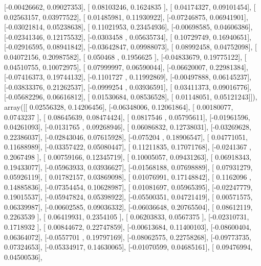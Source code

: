 \documentclass{article}
\begin{document}
       [-0.00426662,  0.09027353],
       [ 0.08103246,  0.1624835 ],
       [ 0.04174327,  0.09101454],
       [ 0.02563157,  0.03977522],
       [ 0.01485981,  0.11930922],
       [-0.07246875,  0.06941901],
       [-0.03021814,  0.05238638],
       [ 0.11021953,  0.23454936],
       [-0.00698585,  0.04606386],
       [-0.02341346,  0.12175532],
       [-0.0303458 ,  0.05635734],
       [ 0.10729749,  0.16940651],
       [-0.02916595,  0.08941842],
       [-0.03642847,  0.09988073],
       [ 0.08992458,  0.04752098],
       [ 0.04072156,  0.20987582],
       [ 0.050468  ,  0.1956625 ],
       [-0.04833679,  0.19775122],
       [ 0.04510755,  0.10072975],
       [ 0.07999997,  0.06590044],
       [-0.06620007,  0.22981384],
       [-0.07416373,  0.19744132],
       [-0.1101727 ,  0.11992869],
       [-0.00497888,  0.06145237],
       [-0.03833376,  0.21262537],
       [-0.0999254 ,  0.03936591],
       [ 0.03411373,  0.09016776],
       [-0.05682296,  0.06616812],
       [ 0.01530684,  0.08536528],
       [ 0.01148051,  0.05121243]]), array([[ 0.02556328,  0.14206456],
       [-0.06348006,  0.12061864],
       [ 0.00180077,  0.0743237 ],
       [ 0.08645639,  0.08474424],
       [ 0.0817546 ,  0.05795611],
       [-0.01961596,  0.04261093],
       [-0.0131765 ,  0.09268946],
       [ 0.06086832,  0.12738031],
       [-0.03269628,  0.22386037],
       [-0.02843046,  0.07615928],
       [-0.075204  ,  0.18906547],
       [ 0.04771051,  0.11688989],
       [-0.03357422,  0.05080447],
       [ 0.11211835,  0.17071768],
       [-0.0241367 ,  0.2067498 ],
       [ 0.00759166,  0.12345719],
       [ 0.10005057,  0.09431263],
       [ 0.06918343,  0.19433077],
       [-0.05963933,  0.03936627],
       [-0.01568188,  0.07698889],
       [ 0.07931279,  0.05926119],
       [ 0.01782157,  0.03869098],
       [ 0.01076991,  0.17148842],
       [ 0.1162096 ,  0.14885836],
       [-0.07354454,  0.10628987],
       [ 0.01081697,  0.05965395],
       [-0.02247779,  0.19015537],
       [-0.05947824,  0.05398922],
       [-0.05500351,  0.04721419],
       [ 0.00571575,  0.06339987],
       [-0.00602585,  0.09036332],
       [-0.06036648,  0.20765504],
       [ 0.08612119,  0.2263539 ],
       [ 0.06419931,  0.2354105 ],
       [ 0.06203833,  0.0567375 ],
       [-0.02310731,  0.1718932 ],
       [ 0.00844672,  0.22747859],
       [-0.00613684,  0.11400103],
       [-0.08600404,  0.06364072],
       [-0.0557701 ,  0.19797169],
       [-0.08062575,  0.22758268],
       [-0.09773735,  0.07324653],
       [-0.05334917,  0.14630065],
       [-0.01070599,  0.04685161],
       [ 0.09476994,  0.04500536],
\end{document}
